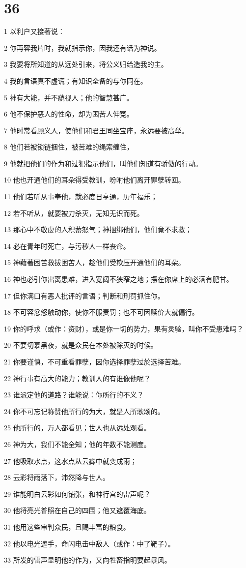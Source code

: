 \chapter{36}

\par 1 以利户又接著说：
\par 2 你再容我片时，我就指示你，因我还有话为神说。
\par 3 我要将所知道的从远处引来，将公义归给造我的主。
\par 4 我的言语真不虚谎；有知识全备的与你同在。
\par 5 神有大能，并不藐视人；他的智慧甚广。
\par 6 他不保护恶人的性命，却为困苦人伸冤。
\par 7 他时常看顾义人，使他们和君王同坐宝座，永远要被高举。
\par 8 他们若被锁链捆住，被苦难的绳索缠住，
\par 9 他就把他们的作为和过犯指示他们，叫他们知道有骄傲的行动。
\par 10 他也开通他们的耳朵得受教训，吩咐他们离开罪孽转回。
\par 11 他们若听从事奉他，就必度日亨通，历年福乐；
\par 12 若不听从，就要被刀杀灭，无知无识而死。
\par 13 那心中不敬虔的人积蓄怒气；神捆绑他们，他们竟不求救；
\par 14 必在青年时死亡，与污秽人一样丧命。
\par 15 神藉著困苦救拔困苦人，趁他们受欺压开通他们的耳朵。
\par 16 神也必引你出离患难，进入宽阔不狭窄之地；摆在你席上的必满有肥甘。
\par 17 但你满口有恶人批评的言语；判断和刑罚抓住你。
\par 18 不可容忿怒触动你，使你不服责罚；也不可因赎价大就偏行。
\par 19 你的呼求（或作：资财），或是你一切的势力，果有灵验，叫你不受患难吗？
\par 20 不要切慕黑夜，就是众民在本处被除灭的时候。
\par 21 你要谨慎，不可重看罪孽，因你选择罪孽过於选择苦难。
\par 22 神行事有高大的能力；教训人的有谁像他呢？
\par 23 谁派定他的道路？谁能说：你所行的不义？
\par 24 你不可忘记称赞他所行的为大，就是人所歌颂的。
\par 25 他所行的，万人都看见；世人也从远处观看。
\par 26 神为大，我们不能全知；他的年数不能测度。
\par 27 他吸取水点，这水点从云雾中就变成雨；
\par 28 云彩将雨落下，沛然降与世人。
\par 29 谁能明白云彩如何铺张，和神行宫的雷声呢？
\par 30 他将亮光普照在自己的四围；他又遮覆海底。
\par 31 他用这些审判众民，且赐丰富的粮食。
\par 32 他以电光遮手，命闪电击中敌人（或作：中了靶子）。
\par 33 所发的雷声显明他的作为，又向牲畜指明要起暴风。

